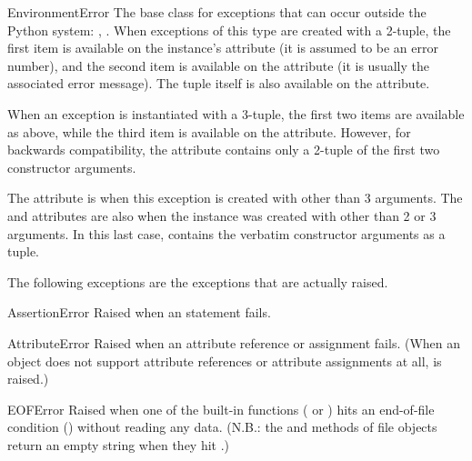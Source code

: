 \begin{excdesc}{EnvironmentError}
The base class for exceptions that
can occur outside the Python system: ,
.  When exceptions of this type are created with a
2-tuple, the first item is available on the instance's 
attribute (it is assumed to be an error number), and the second item
is available on the  attribute (it is usually the
associated error message).  The tuple itself is also available on the
 attribute.

When an  exception is instantiated with a
3-tuple, the first two items are available as above, while the third
item is available on the  attribute.  However, for
backwards compatibility, the  attribute contains only a
2-tuple of the first two constructor arguments.

The  attribute is  when this exception is
created with other than 3 arguments.  The  and
 attributes are also  when the instance was
created with other than 2 or 3 arguments.  In this last case,
 contains the verbatim constructor arguments as a tuple.
\end{excdesc}



The following exceptions are the exceptions that are actually raised.

\begin{excdesc}{AssertionError}
Raised when an  statement fails.
\end{excdesc}

\begin{excdesc}{AttributeError}
  Raised when an attribute reference or assignment fails.  (When an
  object does not support attribute references or attribute assignments
  at all,  is raised.)
\end{excdesc}

\begin{excdesc}{EOFError}
  Raised when one of the built-in functions ( or
  ) hits an end-of-file condition (\EOF) without
  reading any data.
  (N.B.: the  and  methods of file
  objects return an empty string when they hit \EOF.)
\end{excdesc}

